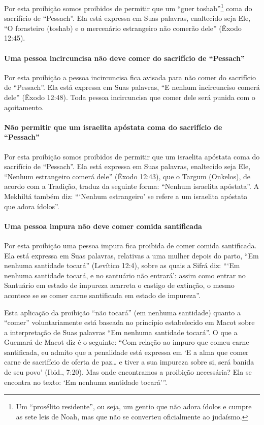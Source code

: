 Por esta proibição somos proibidos de permitir que um ``guer
toshab''\footnote{Um ``prosélito residente'', ou seja, um gentio que não adora
ídolos e cumpre as sete leis de Noah, mas que não se converteu
oficialmente ao judaísmo.} coma do sacrifício de ``Pessach''. Ela
está expressa em Suas palavras, enaltecido seja Ele, ``O forasteiro
(toshab) e o mercenário estrangeiro não comerão dele'' (Êxodo 12:45).

\paragraph{Uma pessoa incircuncisa não deve comer do sacrifício de ``Pessach''}

Por esta proibição a pessoa incircuncisa fica avisada para não comer do
sacrifício de ``Pessach''. Ela está expressa em Suas palavras, ``E nenhum
incircunciso comerá dele'' (Êxodo 12:48). Toda pessoa incircuncisa que
comer dele será punida com o açoitamento.

\paragraph{Não permitir que um israelita apóstata coma do sacrifício de ``Pessach''}

Por esta proibição somos proibidos de permitir que um israelita
apóstata coma do sacrifício de ``Pessach''. Ela está expressa em Suas
palavras, enaltecido seja Ele, ``Nenhum estrangeiro comerá dele''
(Êxodo 12:43), que o Targum
(Onkelos), de acordo com a Tradição, traduz da seguinte forma: ``Nenhum
israelita apóstata''. A Mekhiltá também diz: ```Nenhum estrangeiro' se
refere a um israelita apóstata que adora ídolos''.

\paragraph{Uma pessoa impura não deve comer comida santificada}

Por esta proibição uma pessoa impura fica proibida de comer comida
santificada. Ela está expressa em Suas palavras, relativas a uma mulher
depois do parto, ``Em nenhuma santidade tocará'' (Levítico 12:4), sobre
as quais a Sifrá diz: ```Em nenhuma santidade tocará, e no santuário não
entrará': assim como entrar no Santuário em estado de impureza acarreta
o castigo de extinção, o mesmo acontece se se comer carne santificada em
estado de impureza''.

Esta aplicação da proibição ``não tocará'' (em nenhuma santidade) quanto
a ``comer'' voluntariamente está baseada no princípio estabelecido em
Macot sobre a interpretação de Suas palavras ``Em nenhuma santidade
tocará''. O que a Guemará de Macot diz é o seguinte: ``Com relação ao
impuro que comeu carne santificada, eu admito que a penalidade está
expressa em `E a alma que comer carne de sacrifício de oferta de paz\ldots{}
e tiver a sua impureza sobre si, será banida de seu povo' (Ibid., 7:20).
Mas onde encontramos a proibição necessária? Ela se encontra no texto:
`Em nenhuma santidade tocará'''.

